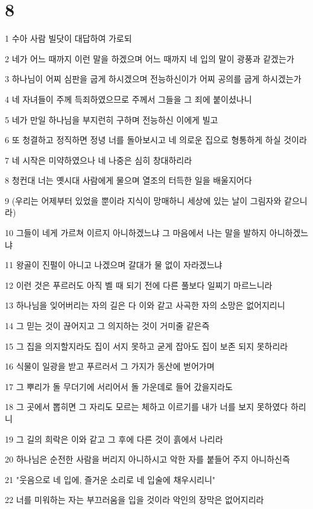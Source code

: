 \chapter{8}

\par 1 수아 사람 빌닷이 대답하여 가로되
\par 2 네가 어느 때까지 이런 말을 하겠으며 어느 때까지 네 입의 말이 광풍과 같겠는가
\par 3 하나님이 어찌 심판을 굽게 하시겠으며 전능하신이가 어찌 공의를 굽게 하시겠는가
\par 4 네 자녀들이 주께 득죄하였으므로 주께서 그들을 그 죄에 붙이셨나니
\par 5 네가 만일 하나님을 부지런히 구하며 전능하신 이에게 빌고
\par 6 또 청결하고 정직하면 정녕 너를 돌아보시고 네 의로운 집으로 형통하게 하실 것이라
\par 7 네 시작은 미약하였으나 네 나중은 심히 창대하리라
\par 8 청컨대 너는 옛시대 사람에게 물으며 열조의 터득한 일을 배울지어다
\par 9 (우리는 어제부터 있었을 뿐이라 지식이 망매하니 세상에 있는 날이 그림자와 같으니라)
\par 10 그들이 네게 가르쳐 이르지 아니하겠느냐 그 마음에서 나는 말을 발하지 아니하겠느냐
\par 11 왕골이 진펄이 아니고 나겠으며 갈대가 물 없이 자라겠느냐
\par 12 이런 것은 푸르러도 아직 벨 때 되기 전에 다른 풀보다 일찌기 마르느니라
\par 13 하나님을 잊어버리는 자의 길은 다 이와 같고 사곡한 자의 소망은 없어지리니
\par 14 그 믿는 것이 끊어지고 그 의지하는 것이 거미줄 같은즉
\par 15 그 집을 의지할지라도 집이 서지 못하고 굳게 잡아도 집이 보존 되지 못하리라
\par 16 식물이 일광을 받고 푸르러서 그 가지가 동산에 벋어가며
\par 17 그 뿌리가 돌 무더기에 서리어서 돌 가운데로 들어 갔을지라도
\par 18 그 곳에서 뽑히면 그 자리도 모르는 체하고 이르기를 내가 너를 보지 못하였다 하리니
\par 19 그 길의 희락은 이와 같고 그 후에 다른 것이 흙에서 나리라
\par 20 하나님은 순전한 사람을 버리지 아니하시고 악한 자를 붙들어 주지 아니하신즉
\par 21 "웃음으로 네 입에, 즐거운 소리로 네 입술에 채우시리니"
\par 22 너를 미워하는 자는 부끄러움을 입을 것이라 악인의 장막은 없어지리라

